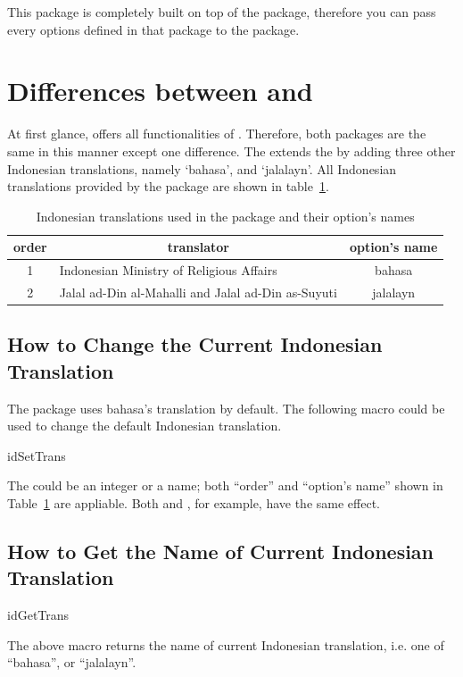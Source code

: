 \documentclass[a4paper]{ltxdoc}
\begin{document}
This package is completely built on top of the  package, therefore you can pass every options
defined in that package to the  package.

\section{Differences between  and }
At first glance,   offers all functionalities of . Therefore,
both packages are the same in this manner except one difference. The  extends the 
by adding three other Indonesian translations, namely `bahasa', and `jalalayn'. All Indonesian translations
provided by the package are shown in table~\ref{tab:idtrans}.

\begin{table}[!htbp]
\centering
\begin{tabular}{|c|l|c|}
    \toprule
    order & \multicolumn{1}{c|}{translator} & option's name \\\midrule
    1 & Indonesian Ministry of Religious Affairs & bahasa \\
    2 & Jalal ad-Din al-Mahalli and Jalal ad-Din as-Suyuti  & jalalayn \\
    \bottomrule
\end{tabular}
    \caption{Indonesian translations used in the package and their option's names}
    \label{tab:idtrans}
\end{table}

\subsection{How to Change the Current Indonesian Translation}
    The  package uses bahasa's translation by default.
    The following macro could be used to change the default Indonesian translation.
    \begin{declcs}{idSetTrans}
    \end{declcs}
    The  could be an integer or a name; both ``order'' and ``option's name''
    shown in Table~\ref{tab:idtrans} are appliable. Both  and , for example,
    have the same effect.

\subsection{How to Get the Name of Current Indonesian Translation}
    \begin{declcs}{idGetTrans}
    \end{declcs}
    The above macro returns the name of current Indonesian translation, i.e.  one of ``bahasa'', or ``jalalayn''.
\end{document}
